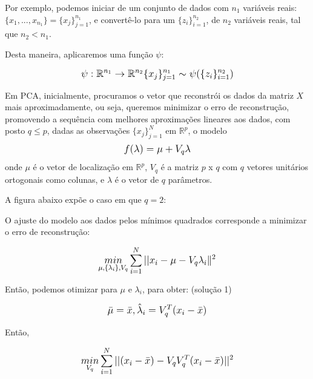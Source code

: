 \documentclass{article}
\begin{document}
Por exemplo, podemos iniciar de um conjunto de dados com $n_1$ variáveis reais: $\{x_1, ..., x_{n_1} \} = \{ x_j \}_{j=1}^{n_1}$, e convertê-lo para um $\{ z_i \}_{i=1}^{n_2}$, de $n_2$ variáveis reais, tal que $n_2 < n_1$.

Desta maneira, aplicaremos uma função $\psi$:

\begin{equation}
\mathlarger{
\psi : \mathbb{R}^{n_1} \rightarrow \mathbb{R}^{n_2} \\
\{ x_j \}_{j=1}^{n_1} \sim \psi(\{ z_i \}_{i=1}^{n_2})
}
\end{equation}


Em PCA, inicialmente, procuramos o vetor que reconstrói os dados da matriz $X$ mais aproximadamente, ou seja,
queremos minimizar o erro de reconstrução, promovendo a sequência com melhores aproximações lineares aos dados, com posto $q \leq p$,   dadas as observações $\{ x_j \}_{j=1}^{N}$ em $\mathbb{R}^p$, o modelo 
\begin{equation}
\mathlarger{
f(\lambda) = \mu + V_q \lambda
}
\end{equation}
onde $\mu$ é o vetor de localização em $\mathbb{R}^p$, $V_q$ é a matriz $p$ x $q$ com $q$ vetores unitários ortogonais como colunas, e $\lambda$ é o vetor de $q$ parâmetros.

A figura abaixo expõe o caso em que $q=2$:


O ajuste do modelo aos dados pelos mínimos quadrados corresponde a minimizar o erro de reconstrução:

\begin{equation}
\mathlarger{
\underset{\mu, \{ \lambda_i \}, V_q}{min} \sum_{i=1}^{N} || x_i - \mu - V_q \lambda_i \|^2
}
\end{equation}

Então, podemos otimizar para $\mu$ e 
$\lambda_i$, para obter: (solução 1)

\begin{equation}
\mathlarger{
\bar{\mu} = \bar{x}, \\
\hat{\lambda}_i = V_q^T(x_i - \bar{x})
}
\end{equation}

Então,

\begin{equation}
\mathlarger{
\underset{V_q}{min} \sum_{i=1}^{N} || (x_i - \bar{x}) - V_q V_q^T(x_i - \bar{x}) ||^2
}
\end{equation}
\end{document}
